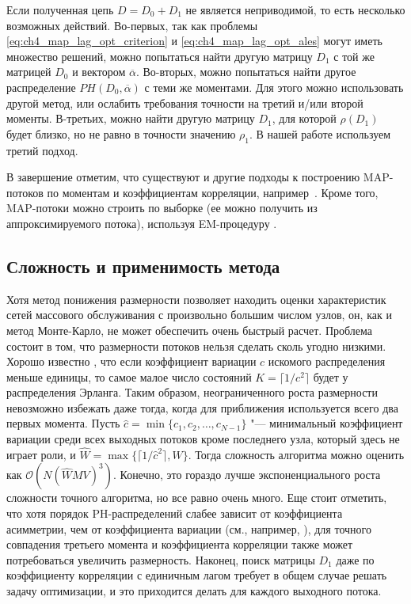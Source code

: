 Если полученная цепь $D = D_0 + D_1$ не является неприводимой, то есть несколько возможных действий. Во-первых, так как проблемы \eqref{eq:ch4_map_lag_opt_criterion} и \eqref{eq:ch4_map_lag_opt_ales} могут иметь множество решений, можно попытаться найти другую матрицу $D_1$ с той же матрицей $D_0$ и вектором $\overline{\alpha}$. Во-вторых, можно попытаться найти другое распределение $PH(D_0, \overline{\alpha})$ с теми же моментами. Для этого можно использовать другой метод, или ослабить требования точности на третий и/или второй моменты. В-третьих, можно найти другую матрицу $D_1$, для которой $\rho(D_1)$ будет близко, но не равно в точности значению $\rho_1$. В нашей работе используем третий подход.

В завершение отметим, что существуют и другие подходы к построению MAP-потоков по моментам и коэффициентам корреляции, например~\cite{TelekHorvath2007,Bodrog2010}. Кроме того, MAP-потоки можно строить по выборке (ее можно получить из аппроксимируемого потока), используя EM-процедуру \cite{Horvath2013,Ephraim2009,Buchholz2003}.


\subsection{Сложность и применимость метода}\label{sec:ch4_approx_complexity}

Хотя метод понижения размерности позволяет находить оценки характеристик сетей массового обслуживания с произвольно большим числом узлов, он, как и метод Монте-Карло, не может обеспечить очень быстрый расчет. Проблема состоит в том, что размерности потоков нельзя сделать сколь угодно низкими. Хорошо известно \cite{Aldous1987}, что если коэффициент вариации $c$ искомого распределения меньше единицы, то самое малое число состояний $K = \lceil 1 / c^2 \rceil $ будет у распределения Эрланга. Таким образом, неограниченного роста размерности невозможно избежать даже тогда, когда для приближения используется всего два первых момента. Пусть $\hat{c} = \min\{c_1, c_2, \dots, c_{N-1}\}$ "--- минимальный коэффициент вариации среди всех выходных потоков кроме последнего узла, который здесь не играет роли, и $\hat{W} = \max\{\lceil 1 / \hat{c}^2 \rceil, W\}$. Тогда сложность алгоритма можно оценить как $\mathcal{O}(N (\hat{W}MV)^3 )$. Конечно, это гораздо лучше экспоненциального роста сложности точного алгоритма, но все равно очень много. Еще стоит отметить, что хотя порядок PH-распределений слабее зависит от коэффициента асимметрии, чем от коэффициента вариации (см., например, \cite{Johnson1989}), для точного совпадения третьего момента и коэффициента корреляции также может потребоваться увеличить размерность. Наконец, поиск матрицы $D_1$ даже по коэффициенту корреляции с единичным лагом требует в общем случае решать задачу оптимизации, и это приходится делать для каждого выходного потока.




